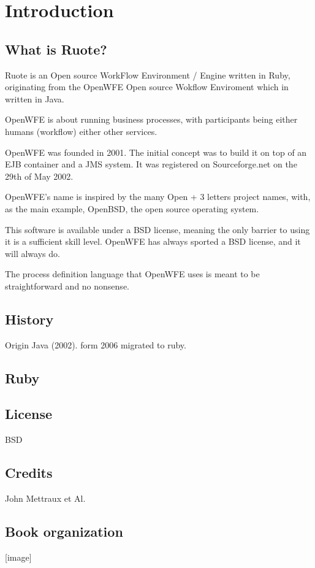 

\chapter{Introduction}


\section{What is Ruote?}

Ruote is an Open source WorkFlow Environment / Engine written in Ruby, 
originating from the OpenWFE Open source Wokflow Enviroment which in written in Java.

OpenWFE is about running business processes, with participants being either 
humans (workflow) either other services.

OpenWFE was founded in 2001. The initial concept was to build it on top of an EJB container and a JMS system. It was registered on Sourceforge.net on the 29th of May 2002.

OpenWFE's name is inspired by the many Open + 3 letters project names, with, as the main example, OpenBSD, the open source operating system.

This software is available under a BSD license, meaning the only barrier to using it is a sufficient skill level. OpenWFE has always sported a BSD license, and it will always do.

The process definition language that OpenWFE uses is meant to be straightforward and no nonsense. 



\section{History}

Origin Java (2002). form 2006  migrated to ruby.

\section{Ruby}


\section{License}

BSD

\section{Credits}

John Mettraux et Al.

\section{Book organization}

[image]

